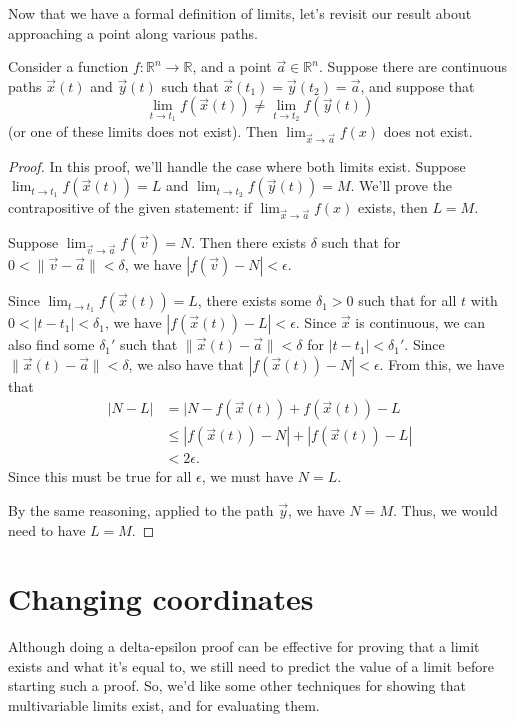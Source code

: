 \documentclass{ximera}
\begin{document}
Now that we have a formal definition of limits, let's revisit our result about approaching a point along various paths.

\begin{proposition}
Consider a function $f:\mathbb{R}^n\rightarrow \mathbb{R}$, and a point $\vec{a}\in\mathbb{R}^n$. Suppose there are continuous paths $\vec{x}(t)$ and $\vec{y}(t)$ such that $\vec{x}(t_1) = \vec{y}(t_2) = \vec{a}$, and suppose that
\[
\lim_{t\rightarrow t_1}f(\vec{x}(t))\neq \lim_{t\rightarrow t_2}f(\vec{y}(t))
\]
(or one of these limits does not exist). Then $\lim_{\vec{x}\rightarrow\vec{a}}f(x)$ does not exist.
\end{proposition}

\begin{proof}
In this proof, we'll handle the case where both limits exist. Suppose $\lim_{t\rightarrow t_1}f(\vec{x}(t)) = L$ and $\lim_{t\rightarrow t_2}f(\vec{y}(t)) = M$. We'll prove the contrapositive of the given statement: if $\lim_{\vec{x}\rightarrow\vec{a}}f(x)$ exists, then $L=M$.

Suppose $\lim_{\vec{v}\rightarrow\vec{a}}f(\vec{v})=N$. Then there exists $\delta$ such that for $0< \|\vec{v} - \vec{a}\| < \delta$, we have $|f(\vec{v}) - N| < \epsilon$.

Since $\lim_{t\rightarrow t_1}f(\vec{x}(t)) = L$, there exists some $\delta_1>0$ such that for all $t$ with $0<|t-t_1|<\delta_1$, we have $|f(\vec{x}(t))-L|<\epsilon$. Since $\vec{x}$ is continuous, we can also find some $\delta_1'$ such that $\|\vec{x}(t)-\vec{a}\|<\delta$ for $|t-t_1|<\delta_1'$. Since $\|\vec{x}(t) - \vec{a}\| < \delta$, we also have that $|f(\vec{x}(t)) - N| < \epsilon$. From this, we have that
\begin{align*}
|N-L| &= |N-f(\vec{x}(t)) + f(\vec{x}(t)) - L\\
&\leq |f(\vec{x}(t))-N| + |f(\vec{x}(t)) - L|\\
&< 2\epsilon.
\end{align*}
Since this must be true for all $\epsilon$, we must have $N=L$.

By the same reasoning, applied to the path $\vec{y}$, we have $N=M$. Thus, we would need to have $L=M$.
\end{proof}

\section*{Changing coordinates}

Although doing a delta-epsilon proof can be effective for proving that a limit exists and what it's equal to, we still need to predict the value of a limit before starting such a proof. So, we'd like some other techniques for showing that multivariable limits exist, and for evaluating them.
\end{document}
